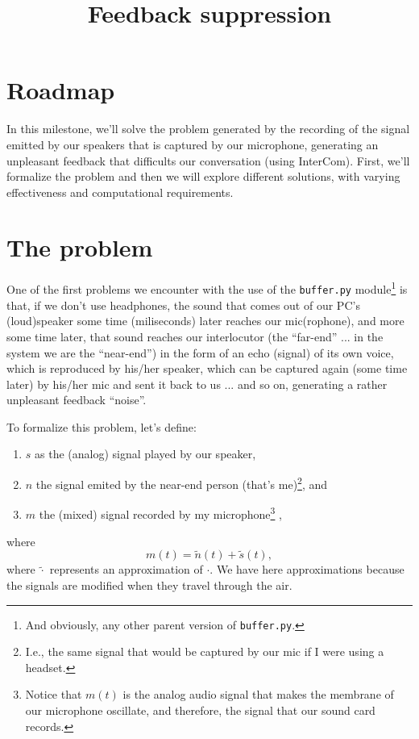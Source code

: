 
\title{Feedback suppression}

\maketitle

\tableofcontents

\section{Roadmap}

In this milestone, we'll solve the problem generated by the recording
of the signal emitted by our speakers that is captured by our
microphone, generating an unpleasant feedback that difficults our
conversation (using InterCom). First, we'll formalize the problem and
then we will explore different solutions, with varying effectiveness
and computational requirements.

\section{The problem}

One of the first problems we encounter with the use of the
\texttt{buffer.py} module\footnote{And obviously, any other parent
  version of \texttt{buffer.py}.} is that, if we don't use headphones,
the sound that comes out of our PC's (loud)speaker some time
(miliseconds) later reaches our mic(rophone), and more some time
later, that sound reaches our interlocutor (the ``far-end'' ... in the
system we are the ``near-end'') in the form of an echo (signal) of its
own voice, which is reproduced by his/her speaker, which can be
captured again (some time later) by his/her mic and sent it back to us
... and so on, generating a rather unpleasant feedback ``noise''.

To formalize this problem, let's define:
\begin{enumerate}
\item $s$ as the (analog) signal played by our
  speaker, %
\item $n$ the signal emited by
  the near-end person (that's me)\footnote{I.e.,
  the same signal that would be captured by our mic if I were using a
  headset.}, and %
\item $m$ the (mixed) signal recorded by my microphone\footnote{Notice
that $m(t)$ is the analog audio signal that makes the membrane of our
microphone oscillate, and therefore, the signal that our sound card
records.}  ,
\end{enumerate}
where
\begin{equation}
  m(t) = \tilde{n}(t) + \tilde{s}(t),
  \label{eq:echo_problem}
\end{equation}
where $\tilde{\cdot}$ represents an approximation of $\cdot$. We have
here approximations because the signals are modified when they travel
through the air.

